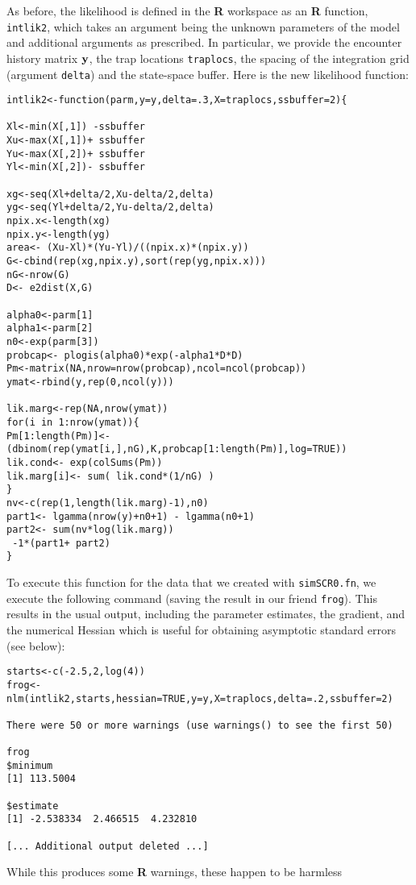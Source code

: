 As before, the likelihood is defined in the {\bf R} workspace as an
{\bf R}
function, \mbox{\tt intlik2}, 
 which takes an argument being the unknown parameters of the
model and additional arguments as prescribed. In particular, 
 we provide the encounter history matrix ${\bf y}$, the trap locations
\mbox{\tt traplocs}, the spacing of the integration grid (argument
\mbox{\tt delta}) and the
state-space buffer. Here is the new likelihood function:
{\small
\begin{verbatim}
intlik2<-function(parm,y=y,delta=.3,X=traplocs,ssbuffer=2){

Xl<-min(X[,1]) -ssbuffer
Xu<-max(X[,1])+ ssbuffer
Yu<-max(X[,2])+ ssbuffer
Yl<-min(X[,2])- ssbuffer

xg<-seq(Xl+delta/2,Xu-delta/2,delta) 
yg<-seq(Yl+delta/2,Yu-delta/2,delta) 
npix.x<-length(xg)
npix.y<-length(yg)
area<- (Xu-Xl)*(Yu-Yl)/((npix.x)*(npix.y))
G<-cbind(rep(xg,npix.y),sort(rep(yg,npix.x)))
nG<-nrow(G)
D<- e2dist(X,G) 

alpha0<-parm[1]
alpha1<-parm[2]
n0<-exp(parm[3])
probcap<- plogis(alpha0)*exp(-alpha1*D*D)
Pm<-matrix(NA,nrow=nrow(probcap),ncol=ncol(probcap))
ymat<-rbind(y,rep(0,ncol(y)))

lik.marg<-rep(NA,nrow(ymat))
for(i in 1:nrow(ymat)){
Pm[1:length(Pm)]<- (dbinom(rep(ymat[i,],nG),K,probcap[1:length(Pm)],log=TRUE))
lik.cond<- exp(colSums(Pm))
lik.marg[i]<- sum( lik.cond*(1/nG) )  
}                                                 
nv<-c(rep(1,length(lik.marg)-1),n0)
part1<- lgamma(nrow(y)+n0+1) - lgamma(n0+1)
part2<- sum(nv*log(lik.marg))
 -1*(part1+ part2)
}
\end{verbatim}
}
To execute this function for the data that we created with \mbox{\tt simSCR0.fn},
 we execute the following command (saving the result in our
friend \mbox{\tt frog}).
This results in the usual output, including the parameter estimates,
the gradient, and the numerical Hessian which is useful for obtaining
asymptotic standard errors (see below):
\begin{verbatim}
starts<-c(-2.5,2,log(4))
frog<-nlm(intlik2,starts,hessian=TRUE,y=y,X=traplocs,delta=.2,ssbuffer=2)

There were 50 or more warnings (use warnings() to see the first 50)

frog
$minimum
[1] 113.5004

$estimate
[1] -2.538334  2.466515  4.232810

[... Additional output deleted ...]
\end{verbatim}
While this produces some {\bf R} warnings, these happen to be harmless
